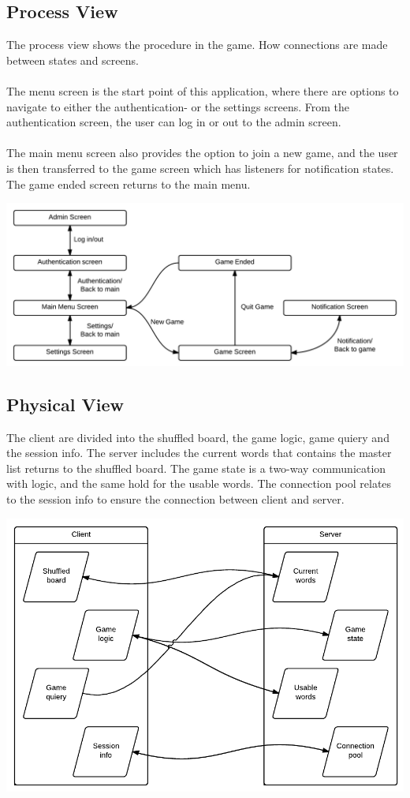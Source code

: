 \subsection{Process View}
The process view shows the procedure in the game. How connections are made
between states and screens. \\\\
The menu screen is the start point of this application, where there are options
to navigate to either the authentication- or the settings screens.
From the authentication screen, the user can log in or out to the admin screen.
\\\\
The main menu screen also provides the option to join a new game, and the user
is then transferred to the game screen which has listeners for notification
states. The game ended screen returns to the main menu.
\begin{center}
\includegraphics[clip=true, width=0.9 \textwidth]{assets/ProcessView.png}
\label{ref:gantt}
\end{center}

\subsection{Physical View}
The client are divided into the shuffled board, the game logic, game quiery and
the session info. The server includes the current words that contains the
master list returns to the shuffled board. The game state is a two-way
communication with logic, and the same hold for the usable words. The connection
pool relates to the session info to ensure the connection between client and server.
\begin{center}
\includegraphics[clip=true, width=0.9 \textwidth]{assets/PhysicalView.pdf}
\label{ref:gantt}
\end{center}
